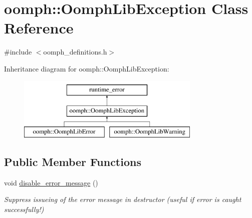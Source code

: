 \hypertarget{classoomph_1_1OomphLibException}{}\section{oomph\+:\+:Oomph\+Lib\+Exception Class Reference}
\label{classoomph_1_1OomphLibException}


{\ttfamily \#include $<$oomph\+\_\+definitions.\+h$>$}

Inheritance diagram for oomph\+:\+:Oomph\+Lib\+Exception\+:\begin{figure}[H]
\begin{center}
\leavevmode
\includegraphics[height=3.000000cm]{classoomph_1_1OomphLibException}
\end{center}
\end{figure}
\subsection*{Public Member Functions}
\begin{DoxyCompactItemize}
\item 
void \hyperlink{classoomph_1_1OomphLibException_a92da7bc6b484044587ca2e8db4e1e507}{disable\+\_\+error\+\_\+message} ()
\begin{DoxyCompactList}\small\item\em Suppress issueing of the error message in destructor (useful if error is caught successfully!) \end{DoxyCompactList}\end{DoxyCompactItemize}
